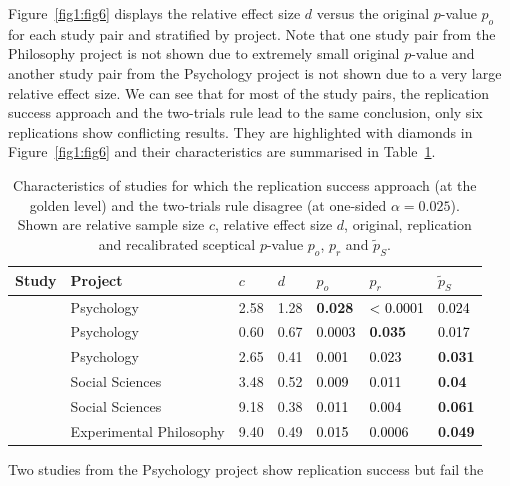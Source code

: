 Figure~\ref{fig1:fig6} displays the relative effect size $d$ versus the original
$p$-value $p_o$ for each study pair and stratified by project. Note that one
study pair from the Philosophy project is not shown due to extremely small
original $p$-value and another study pair from the Psychology project is not
shown due to a very large relative effect size. We can see that for most of the
study pairs, the replication success approach and the two-trials rule lead to
the same conclusion, only six replications show conflicting results. They are
highlighted with diamonds in Figure~\ref{fig1:fig6} and their characteristics are
summarised in Table~\ref{tbl:discrep}.
\begin{table}[!ht]
    \centering
  \caption{Characteristics of studies for which the replication success approach
    (at the golden level) and the two-trials rule disagree (at one-sided
    $\alpha = 0.025$). Shown are relative sample size $c$, relative effect size
    $d$, original, replication and recalibrated sceptical $p$-value $p_o$, $p_r$
    and $\tilde{p}_S$.}
  \label{tbl:discrep}
\resizebox{\textwidth}{!} {
\begin{tabular}{lllllll}
  \toprule
Study & Project & $c$ & $d$ & $p_o$ & $p_r$ & $\tilde{p}_S$ \\
  \midrule
\citet{Schmidt2008} & Psychology & 2.58 & 1.28 & \textbf{0.028} & \textcolor{black}{< 0.0001} & \textcolor{black}{0.024} \\
  \citet{Oberauer2008} & Psychology & 0.60 & 0.67 & \textcolor{black}{0.0003} & \textbf{0.035} & \textcolor{black}{0.017} \\
  \citet{Payne2008} & Psychology & 2.65 & 0.41 & \textcolor{black}{0.001} & \textcolor{black}{0.023} & \textbf{0.031} \\
  \citet{Balafoutas2012} & Social Sciences & 3.48 & 0.52 & \textcolor{black}{0.009} & \textcolor{black}{0.011} & \textbf{0.04} \\
  \citet{Pyc2010} & Social Sciences & 9.18 & 0.38 & \textcolor{black}{0.011} & \textcolor{black}{0.004} & \textbf{0.061} \\
  \citet{Nichols2006} & Experimental Philosophy & 9.40 & 0.49 & \textcolor{black}{0.015} & \textcolor{black}{0.0006} & \textbf{0.049} \\
   \bottomrule
\end{tabular}%
}
\end{table}
Two studies from the Psychology project show replication success but fail the

